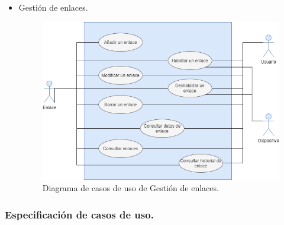 \begin{itemize}
    \item Gestión de enlaces.
    
    \vspace{5mm}

    \begin{figure}[b!]
        \centering
        \includegraphics[width=12cm]{imagenes/diagramas/diagrama_gestion_enlaces}
        \caption{Diagrama de casos de uso de Gestión de enlaces.}
        \label{fig:gestion-de-enlaces}
    \end{figure}
\end{itemize}

\newpage

\subsubsection{Especificación de casos de uso.}


